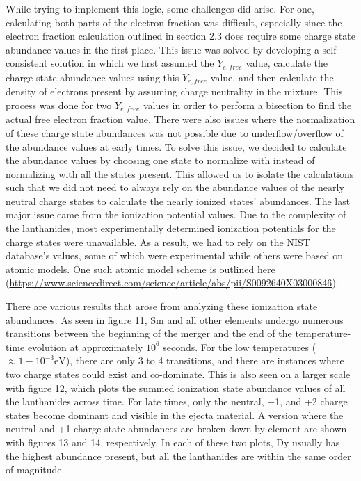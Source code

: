 \documentclass[11pt,a4paper]{article}
\begin{document}
While trying to implement this logic, some challenges did arise. For one, calculating both parts of the electron fraction was difficult, especially since the electron fraction calculation outlined in section 2.3 does require some charge state abundance values in the first place. This issue was solved by developing a self-consistent solution in which we first assumed the $Y_{e,free}$ value, calculate the charge state abundance values using this $Y_{e,free}$ value, and then calculate the density of electrons present by assuming charge neutrality in the mixture. This process was done for two $Y_{e,free}$ values in order to perform a bisection to find the actual free electron fraction value. There were also issues where the normalization of these charge state abundances was not possible due to underflow/overflow of the abundance values at early times. To solve this issue, we decided to calculate the abundance values by choosing one state to normalize with instead of normalizing with all the states present. This allowed us to isolate the calculations such that we did not need to always rely on the abundance values of the nearly neutral charge states to calculate the nearly ionized states' abundances. The last major issue came from the ionization potential values. Due to the complexity of the lanthanides, most experimentally determined ionization potentials for the charge states were unavailable. As a result, we had to rely on the NIST database's values, some of which were experimental while others were based on atomic models. One such atomic model scheme is outlined here (\url{https://www.sciencedirect.com/science/article/abs/pii/S0092640X03000846}).  

There are various results that arose from analyzing these ionization state abundances. As seen in figure 11, Sm and all other elements undergo numerous transitions between the beginning of the merger and the end of the temperature-time evolution at approximately $10^6$ seconds. For the low temperatures ($\approx 1 - 10^{-3} \mathrm{eV}$), there are only 3 to 4 transitions, and there are instances where two charge states could exist and co-dominate. This is also seen on a larger scale with figure 12, which plots the summed ionization state abundance values of all the lanthanides across time. For late times, only the neutral, +1, and +2 charge states become dominant and visible in the ejecta material. A version where the neutral and +1 charge state abundances are broken down by element are shown with figures 13 and 14, respectively. In each of these two plots, Dy usually has the highest abundance present, but all the lanthanides are within the same order of magnitude.
\end{document}
